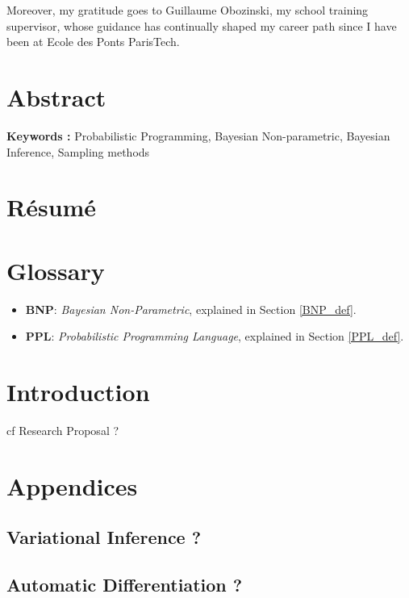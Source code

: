 \documentclass[twoside,10pt,openany,a4paper]{rapport}
\begin{document}
Moreover, my gratitude goes to Guillaume Obozinski, my school training supervisor, whose guidance has continually shaped my career path since I have been at Ecole des Ponts ParisTech.

\chapter{Abstract}

\textbf{Keywords :} Probabilistic Programming, Bayesian Non-parametric, Bayesian Inference, Sampling methods


\chapter{Résumé}



\tableofcontents
{}
\listoffigures
{}

\chapter{Glossary}

\begin{itemize} 
\item \textbf{BNP}:  \textit{Bayesian Non-Parametric}, explained in Section \ref{BNP_def}. \\
\item \textbf{PPL}:  \textit{Probabilistic Programming Language}, explained in Section \ref{PPL_def}. \\

\end{itemize}

\mainmatter


\chapter{Introduction}
cf Research Proposal ?























\appendix
\chapter*{Appendices}
\renewcommand{\thesection}{\Alph{section}}
\section{Variational Inference ?}
\section{Automatic Differentiation ?}

\nocite{*}



\end{document}
